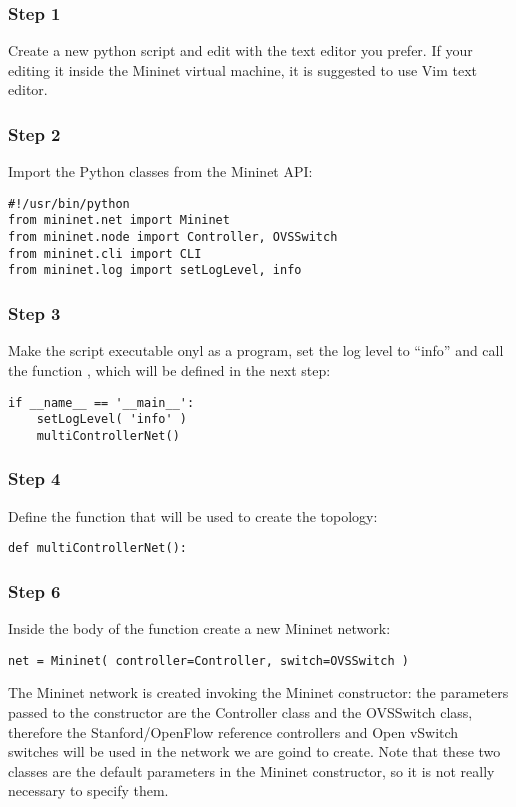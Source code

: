 \subsubsection*{Step 1}
Create a new python script and edit with the text editor you prefer. If your editing
it inside the Mininet virtual machine, it is suggested to use Vim text editor.

\subsubsection*{Step 2}
Import the Python classes from the Mininet API:
\begin{lstlisting}
#!/usr/bin/python
from mininet.net import Mininet
from mininet.node import Controller, OVSSwitch
from mininet.cli import CLI
from mininet.log import setLogLevel, info
\end{lstlisting}

\subsubsection*{Step 3}
Make the script executable onyl as a program, set the log level to ``info''
and call the function , which will be defined in the next
step:
\begin{lstlisting}
if __name__ == '__main__':
    setLogLevel( 'info' )
    multiControllerNet()
\end{lstlisting}

\subsubsection*{Step 4}
Define the function that will be used to create the topology:
\begin{lstlisting}
def multiControllerNet():
\end{lstlisting}

\subsubsection*{Step 6}
Inside the body of the function  create a new Mininet
network:
\begin{lstlisting}
net = Mininet( controller=Controller, switch=OVSSwitch )
\end{lstlisting}

The Mininet network is created invoking the Mininet constructor: the parameters
passed to the constructor are the Controller class and the OVSSwitch class, therefore
the Stanford/OpenFlow reference controllers and Open vSwitch switches will be used
in the network we are goind to create. Note that these two classes are
the default parameters in the Mininet constructor, so it is not really necessary
to specify them.

